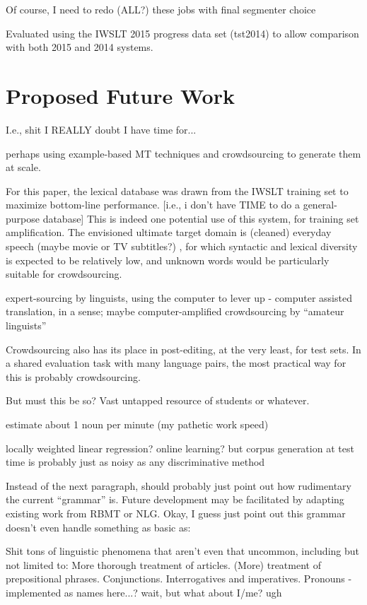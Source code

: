 Of course, I need to redo (ALL?) these jobs with final segmenter choice

Evaluated using the IWSLT 2015 progress data set (tst2014) to allow comparison with both 2015 and 2014 systems.


\section{Proposed Future Work}

I.e., shit I REALLY doubt I have time for...


perhaps using example-based MT techniques  and crowdsourcing to generate them at scale.

For this paper, the lexical database was drawn from the IWSLT training set to maximize bottom-line performance.
[i.e., i don't have TIME to do a general-purpose database]
This is indeed one potential use of this system, for training set amplification.
The envisioned ultimate target domain is (cleaned) everyday speech (maybe movie or TV subtitles?) , for which syntactic and lexical diversity is expected to be relatively low, and unknown words would be particularly suitable for crowdsourcing.

expert-sourcing by linguists, using the computer to lever up - computer assisted translation, in a sense; maybe computer-amplified
crowdsourcing by ``amateur linguists''

Crowdsourcing also has its place in post-editing, at the very least, for test sets.
In a shared evaluation task with many language pairs, the most practical way for this is probably crowdsourcing.

But must this be so? Vast untapped resource of students or whatever.

estimate about 1 noun per minute (my pathetic work speed)

locally weighted linear regression? online learning?
but corpus generation at test time is probably just as noisy as any discriminative method

Instead of the next paragraph, should probably just point out how rudimentary the current ``grammar'' is. 
Future development may be facilitated by adapting existing work from RBMT or NLG. 
Okay, I guess just point out this grammar doesn't even handle something as basic as:

Shit tons of linguistic phenomena that aren't even that uncommon, including but not limited to:
More thorough treatment of articles.
(More) treatment of prepositional phrases.
Conjunctions.
Interrogatives and imperatives.
Pronouns - implemented as names here...? wait, but what about I/me? ugh

